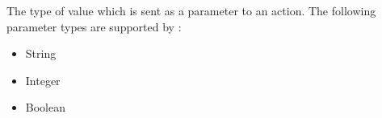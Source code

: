 \item[Parameter Type]{
The type of value which is sent as a parameter to an action.
The following parameter types are supported by \GD:
\begin{itemize}
\item String
\item Integer
\item Boolean
\end{itemize}
}


